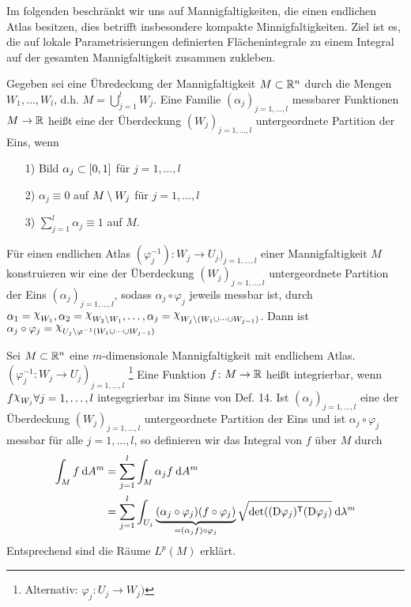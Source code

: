 \documentclass[skript.tex]{subfiles}
\begin{document}
	
	Im folgenden beschränkt wir uns auf Mannigfaltigkeiten, die einen endlichen Atlas besitzen, dies betrifft insbesondere kompakte Minnigfaltigkeiten. Ziel ist es, die auf lokale Parametrisierungen definierten Flächenintegrale zu einem Integral auf der gesamten Mannigfaltigkeit zusammen zukleben.
	
	\begin{defin}
		Gegeben sei eine Übredeckung der Mannigfaltigkeit $M \subset {\mathbb{R}^n}$ durch die Mengen $W_1, \dots, W_l$, d.h. $M = \bigcup _{j=1}^l W_j$. Eine Familie $(\alpha_j)_{j= 1, \dots, l}$ messbarer Funktionen $M \to \mathbb{R}$ heißt eine der Überdeckung $(W_j)_{j = 1, \dots, l}$ untergeordnete Partition der Eins, wenn
		
		\begin{itemize}
			\item[1)] Bild $\alpha_j \subset [0,1]$ für $ j=1, \dots, l$
			\item[2)] $\alpha_j \equiv 0$ auf $ M\setminus W_j$ für $j=1, \dots, l$
			\item[3)] $\sum_{j=1}^{l} \alpha_j \equiv 1$ auf $M$.
		\end{itemize}
	Für einen endlichen Atlas $(\varphi_j^{-1}) \colon W_j \to U_j)_{j=1, \dots,l} $ einer Mannigfaltigkeit $M$ konstruieren wir eine der Überdeckung $(W_j)_{j = 1, \dots, l}$ untergeordnete Partition der Eins $(\alpha_j)_{j = 1, \dots, l}$, sodass $\alpha_j \circ \varphi_j$ jeweils messbar ist, durch $\alpha_1 = \rchi_{W_1}, \alpha_2= \rchi_{W_2 \setminus W_1}, \dots, \alpha_j = \rchi_{W_j \setminus (W_1 \cup \dots \cup W_{j-1})}$. Dann ist $\alpha_j \circ \varphi_j = \rchi_{U_j \setminus \varphi^{-1}(W_1 \cup \dots \cup W_{j-1})}$
	\end{defin}
	
	\begin{defin}
		Sei $M\subset {\mathbb{R}^n}$ eine $m$-dimensionale Mannigfaltigkeit mit endlichem Atlas. $(\varphi_j^{-1} \colon W_j \to U_j)_{j=1, \dots, l}$ \footnote{Alternativ: $\varphi_j \colon U_j \to W_j)$} Eine Funktion $f \colon M \to \mathbb{R}$ heißt integrierbar, wenn $ f \rchi_{W_j} \forall j= 1, \dots, l$ integegrierbar im Sinne von Def. 14. Ist $(\alpha_j)_{j = 1, \dots, l}$ eine der Überdeckung $(W_j)_{j = 1, \dots, l}$ untergeordnete Partition der Eins und ist $\alpha_j \circ \varphi_j$ messbar für alle $j = 1, \dots, l$, so definieren wir das Integral von $f$ über $M$ durch
		\begin{align*}
		  \int_M f \: \mathrm{d} A^m &= \sum_{j=1}^{l} \int_M \alpha_j f \: \mathrm{d} A^m \\
		  &= \sum_{j=1}^{l} \int_{U_j} \underbrace{(\alpha_j \circ \varphi_j)(f \circ \varphi_j)}_{= (\alpha_j f) \circ \varphi_j} \sqrt{\det ((\text{D}\varphi_j)^{\mathsf{T}} (\text{D}\varphi_j)} \: \mathrm{d} \lambda^m
		\end{align*}
		Entsprechend sind die Räume $L^p(M)$ erklärt.		
	\end{defin}
\end{document}
